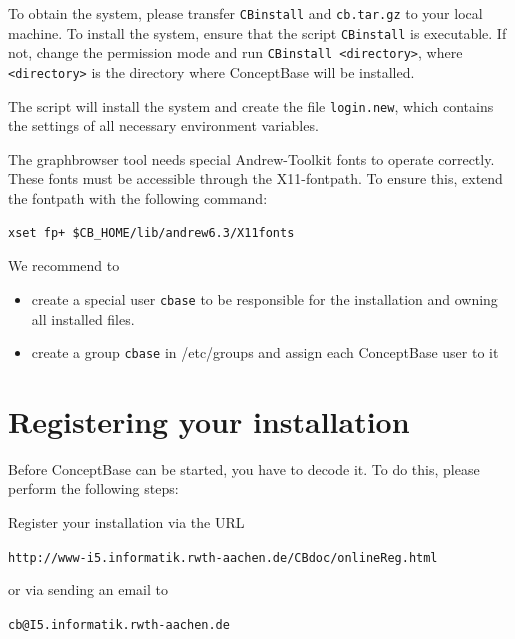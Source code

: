To obtain the system, please transfer \verb+CBinstall+ and {\tt cb\relnrwodot .tar.gz}
 to your local machine.
To install the system, ensure that the script \verb+CBinstall+ is executable.
If not, change the permission mode and run \verb+CBinstall <directory>+,
where \verb+<directory>+ is the directory where ConceptBase will be installed.

The script will install the system and create the file \verb+login.new+,
which contains the settings of all necessary environment variables.


The graphbrowser tool needs special Andrew-Toolkit fonts to
operate correctly. These fonts must be accessible through
the X11-fontpath. To ensure this, extend the fontpath with
the following command:

\begin{verbatim}
xset fp+ $CB_HOME/lib/andrew6.3/X11fonts
\end{verbatim}

We recommend to

\begin{itemize}
\item create a special user \verb+cbase+ to be responsible for the installation
  and owning all installed files.

\item create a group \verb+cbase+ in /etc/groups and assign each
  ConceptBase user to it
\end{itemize}


\section{Registering your installation}

Before ConceptBase can be started, you have to decode it.
To do this, please perform the following steps:

Register your installation via the URL

\begin{latexonly}
\verb+http://www-i5.informatik.rwth-aachen.de/CBdoc/onlineReg.html+
\end{latexonly}

or via sending an email to

\begin{latexonly}
\verb+cb@I5.informatik.rwth-aachen.de+
\end{latexonly}


